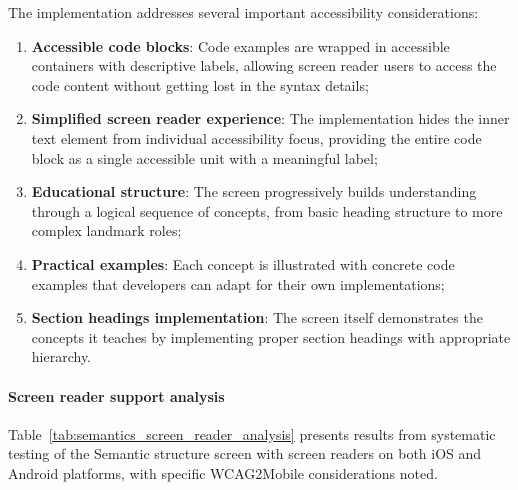 The implementation addresses several important accessibility considerations:

\begin{enumerate}
    \item \textbf{Accessible code blocks}: Code examples are wrapped in accessible containers with descriptive labels, allowing screen reader users to access the code content without getting lost in the syntax details;
    
    \item \textbf{Simplified screen reader experience}: The implementation hides the inner text element from individual accessibility focus, providing the entire code block as a single accessible unit with a meaningful label;
    
    \item \textbf{Educational structure}: The screen progressively builds understanding through a logical sequence of concepts, from basic heading structure to more complex landmark roles;
    
    \item \textbf{Practical examples}: Each concept is illustrated with concrete code examples that developers can adapt for their own implementations;
    
    \item \textbf{Section headings implementation}: The screen itself demonstrates the concepts it teaches by implementing proper section headings with appropriate hierarchy.
\end{enumerate}

\paragraph{Screen reader support analysis}

Table~\ref{tab:semantics_screen_reader_analysis} presents results from systematic testing of the Semantic structure screen with screen readers on both iOS and Android platforms, with specific WCAG2Mobile considerations noted.

